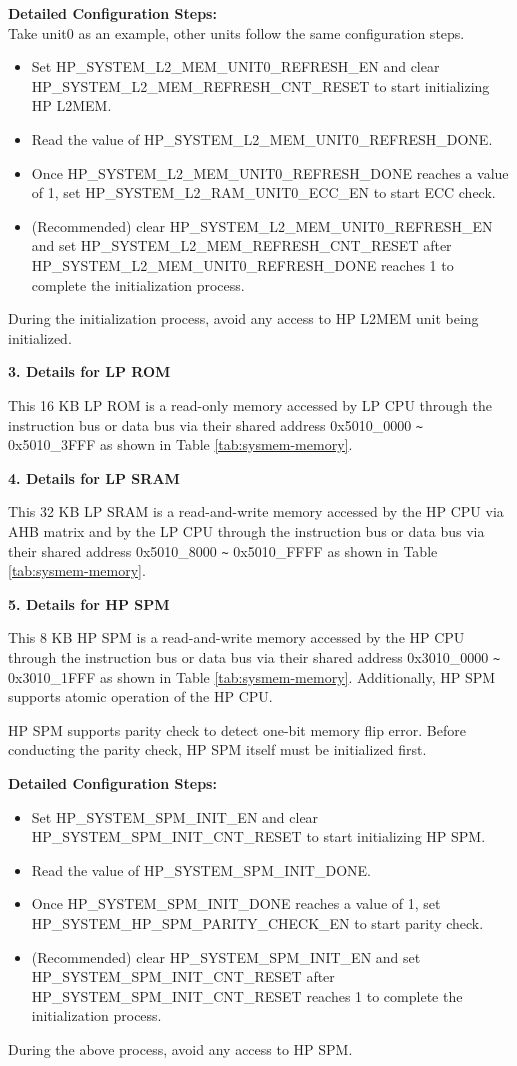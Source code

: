 \documentclass[main\_\_EN.tex]{subfiles}
\begin{document}
\textbf{Detailed Configuration Steps:}\\
Take unit0 as an example, other units follow the same configuration steps.
\begin{itemize}
    \item Set HP\_SYSTEM\_L2\_MEM\_UNIT0\_REFRESH\_EN and clear HP\_SYSTEM\_L2\_MEM\_REFRESH\_CNT\_RESET to start initializing HP L2MEM.
    \item Read the value of HP\_SYSTEM\_L2\_MEM\_UNIT0\_REFRESH\_DONE.
    \item Once HP\_SYSTEM\_L2\_MEM\_UNIT0\_REFRESH\_DONE reaches a value of 1, set HP\_SYSTEM\_L2\_RAM\_UNIT0\_ECC\_EN to start ECC check.
    \item (Recommended) clear HP\_SYSTEM\_L2\_MEM\_UNIT0\_REFRESH\_EN and set HP\_SYSTEM\_L2\_MEM\_REFRESH\_CNT\_RESET after HP\_SYSTEM\_L2\_MEM\_UNIT0\_REFRESH\_DONE reaches 1 to complete the initialization process.
\end{itemize}
During the initialization process, avoid any access to HP L2MEM unit being initialized.

{\bfseries 3. Details for LP ROM}

This 16 KB LP ROM is a read-only memory accessed by LP CPU through the instruction bus or data bus via their shared address 0x5010\_0000 \verb+~+ 0x5010\_3FFF as shown in Table \ref{tab:sysmem-memory}.


{\bfseries 4. Details for LP SRAM}

This 32 KB LP SRAM is a read-and-write memory accessed by the HP CPU via AHB matrix and by the LP CPU through the instruction bus or data bus via their shared address 0x5010\_8000 \verb+~+ 0x5010\_FFFF as shown in Table \ref{tab:sysmem-memory}.

{\bfseries 5. Details for HP SPM}

This 8 KB HP SPM is a read-and-write memory accessed by the HP CPU through the instruction bus or data bus via their shared address 0x3010\_0000 \verb+~+ 0x3010\_1FFF as shown in Table \ref{tab:sysmem-memory}. Additionally, HP SPM supports atomic operation of the HP CPU.

HP SPM supports parity check to detect one-bit memory flip error. Before conducting the parity check, HP SPM itself must be initialized first.

\textbf{Detailed Configuration Steps:}

\begin{itemize}
    \item Set HP\_SYSTEM\_SPM\_INIT\_EN and clear HP\_SYSTEM\_SPM\_INIT\_CNT\_RESET to start initializing HP SPM.
    \item Read the value of HP\_SYSTEM\_SPM\_INIT\_DONE.
    \item Once HP\_SYSTEM\_SPM\_INIT\_DONE reaches a value of 1, set HP\_SYSTEM\_HP\_SPM\_PARITY\_CHECK\_EN to start parity check.
    \item (Recommended) clear HP\_SYSTEM\_SPM\_INIT\_EN and set HP\_SYSTEM\_SPM\_INIT\_CNT\_RESET after HP\_SYSTEM\_SPM\_INIT\_CNT\_RESET reaches 1 to complete the initialization process.
\end{itemize}
During the above process, avoid any access to HP SPM.
\end{document}
